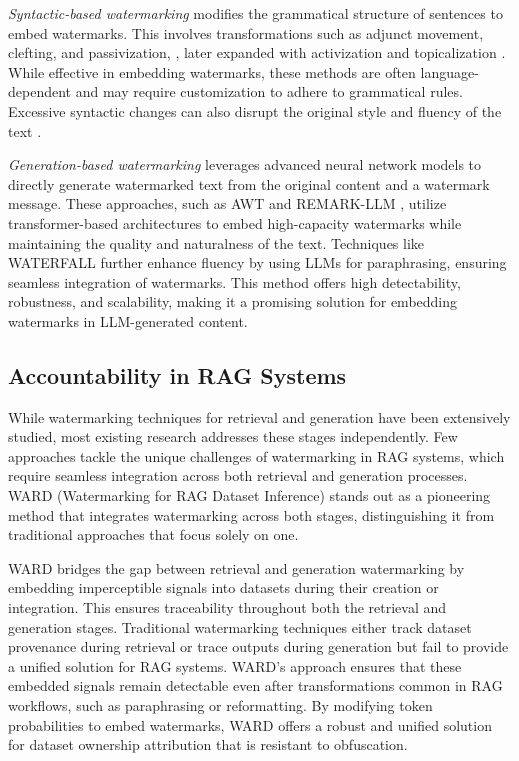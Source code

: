 \textit{Syntactic-based watermarking} modifies the grammatical structure of sentences to embed watermarks. This involves transformations such as adjunct movement, clefting, and passivization, \cite{atallah2001natural}, later expanded with activization and topicalization \cite{topkara2006words}. While effective in embedding watermarks, these methods are often language-dependent and may require customization to adhere to grammatical rules. Excessive syntactic changes can also disrupt the original style and fluency of the text \cite{liu2024survey}.  

\textit{Generation-based watermarking} leverages advanced neural network models to directly generate watermarked text from the original content and a watermark message. These approaches, such as AWT \cite{abdelnabi2021adversarial} and REMARK-LLM \cite{zhang2024remark}, utilize transformer-based architectures to embed high-capacity watermarks while maintaining the quality and naturalness of the text. Techniques like WATERFALL \cite{lau2024waterfall} further enhance fluency by using LLMs for paraphrasing, ensuring seamless integration of watermarks. This method offers high detectability, robustness, and scalability, making it a promising solution for embedding watermarks in LLM-generated content.  

\subsection{Accountability in RAG Systems}

While watermarking techniques for retrieval and generation have been extensively studied, most existing research addresses these stages independently. Few approaches tackle the unique challenges of watermarking in RAG systems, which require seamless integration across both retrieval and generation processes. WARD (Watermarking for RAG Dataset Inference) \cite{jovanovic2024ward} stands out as a pioneering method that integrates watermarking across both stages, distinguishing it from traditional approaches that focus solely on one.

WARD bridges the gap between retrieval and generation watermarking by embedding imperceptible signals into datasets during their creation or integration. This ensures traceability throughout both the retrieval and generation stages. Traditional watermarking techniques either track dataset provenance during retrieval or trace outputs during generation but fail to provide a unified solution for RAG systems. WARD's approach ensures that these embedded signals remain detectable even after transformations common in RAG workflows, such as paraphrasing or reformatting. By modifying token probabilities to embed watermarks, WARD offers a robust and unified solution for dataset ownership attribution that is resistant to obfuscation.

